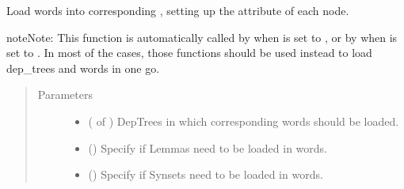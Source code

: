 \documentclass[letterpaper,10pt,english]{sphinxmanual}
\begin{document}
\begin{fulllineitems}
\label{\detokenize{load:loacore.load.word_load.load_words_in_dep_trees}}
Load words into corresponding , setting up the attribute  of each node.

\begin{sphinxadmonition}{note}{Note:}
This function is automatically called by  when  is set to
, or by  when  is set to .
In most of the cases, those functions should be used instead to load dep\_trees and words in one go.
\end{sphinxadmonition}
\begin{quote}\begin{description}
\item[{Parameters}] \leavevmode\begin{itemize}
\item {} 
 ( of {\hyperref[\detokenize{classes:loacore.classes.classes.DepTree}]{}}) \textendash{} DepTrees in which corresponding words should be loaded.

\item {} 
 () \textendash{} Specify if Lemmas need to be loaded in words.

\item {} 
 () \textendash{} Specify if Synsets need to be loaded in words.

\end{itemize}

\end{description}\end{quote}

\end{fulllineitems}

\end{document}
